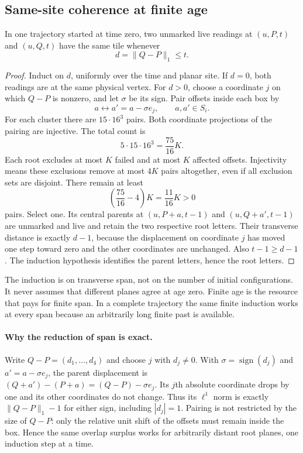 \subsection{Same-site coherence at finite age}

\begin{lemma}\label{nw:same}
In one trajectory started at time zero, two unmarked live readings at $(u,P,t)$ and $(u,Q,t)$ have the same tile whenever
\[
 d=\|Q-P\|_1\le t.
\]
\end{lemma}
\begin{proof}
Induct on $d$, uniformly over the time and planar site. If $d=0$, both readings are at the same physical vertex. For $d>0$, choose a coordinate $j$ on which $Q-P$ is nonzero, and let $\sigma$ be its sign. Pair offsets inside each box by
\[
 a\longleftrightarrow a'=a-\sigma e_j,
 \qquad a,a'\in S_i.
\]
For each cluster there are $15\cdot16^3$ pairs. Both coordinate projections of the pairing are injective. The total count is
\[
 5\cdot15\cdot16^3=\frac{75}{16}K.
\]
Each root excludes at most $K$ failed and at most $K$ affected offsets. Injectivity means these exclusions remove at most $4K$ pairs altogether, even if all exclusion sets are disjoint. There remain at least
\begin{equation}\label{nw:surplus}
 \left(\frac{75}{16}-4\right)K=\frac{11}{16}K>0
\end{equation}
pairs. Select one. Its central parents at $(u,P+a,t-1)$ and $(u,Q+a',t-1)$ are unmarked and live and retain the two respective root letters. Their transverse distance is exactly $d-1$, because the displacement on coordinate $j$ has moved one step toward zero and the other coordinates are unchanged. Also $t-1\ge d-1$. The induction hypothesis identifies the parent letters, hence the root letters.
\end{proof}

The induction is on transverse span, not on the number of initial configurations. It never assumes that different planes agree at age zero. Finite age is the resource that pays for finite span. In a complete trajectory the same finite induction works at every span because an arbitrarily long finite past is available.

\paragraph{Why the reduction of span is exact.}
Write $Q-P=(d_1,\ldots,d_4)$ and choose $j$ with $d_j\ne0$. With $\sigma=\operatorname{sign}(d_j)$ and $a'=a-\sigma e_j$, the parent displacement is $(Q+a')-(P+a)=(Q-P)-\sigma e_j$. Its $j$th absolute coordinate drops by one and its other coordinates do not change. Thus its $\ell^1$ norm is exactly $\|Q-P\|_1-1$ for either sign, including $|d_j|=1$. Pairing is not restricted by the size of $Q-P$: only the relative unit shift of the offsets must remain inside the box. Hence the same overlap surplus works for arbitrarily distant root planes, one induction step at a time.

